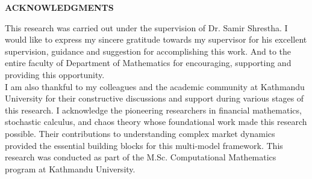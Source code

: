



\begin{center}
	{\Large{\bf{ACKNOWLEDGMENTS}}}\\
\end{center}
\noindent
This research was carried out under the supervision of Dr. Samir Shrestha. I would like to express my sincere gratitude towards my supervisor for his excellent supervision, guidance and suggestion for accomplishing this work. And to the entire faculty of Department of Mathematics for encouraging, supporting and providing this opportunity.\\
\noindent
I am also thankful to my colleagues and the academic community at Kathmandu University for their constructive discussions and support during various stages of this research.
\noindent
I acknowledge the pioneering researchers in financial mathematics, stochastic calculus, and chaos theory whose foundational work made this research possible. Their contributions to understanding complex market dynamics provided the essential building blocks for this multi-model framework.
This research was conducted as part of the M.Sc. Computational Mathematics program at Kathmandu University.



